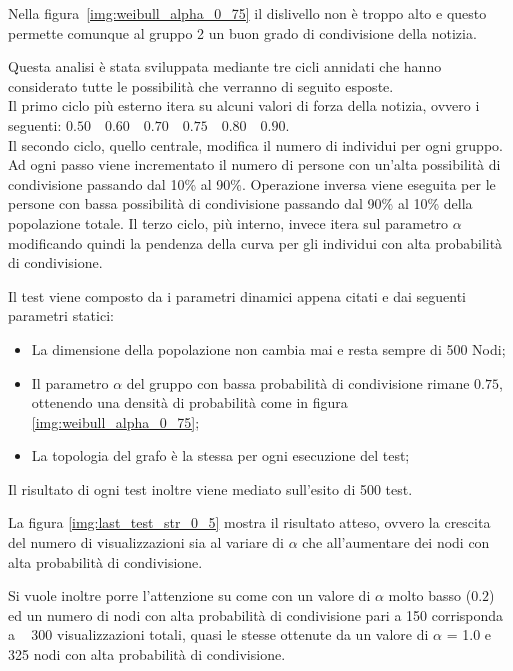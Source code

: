 Nella figura~\ref{img:weibull_alpha_0_75} il dislivello non è troppo alto e questo permette 
comunque al gruppo 2 un buon grado di condivisione della notizia.

Questa analisi è stata sviluppata mediante tre cicli annidati che hanno considerato tutte le 
possibilità che verranno di seguito esposte.\\
Il primo ciclo più esterno itera su alcuni valori di forza della notizia, 
ovvero i seguenti: $0.50 \quad 0.60 \quad 0.70 \quad 0.75 \quad 0.80 \quad 0.90$.\\
Il secondo ciclo, quello centrale, modifica il numero di individui per ogni gruppo. 
Ad ogni passo viene incrementato il numero di persone con un'alta possibilità di condivisione 
passando dal 10\% al 90\%. Operazione inversa viene eseguita per le persone con bassa possibilità di 
condivisione passando dal 90\% al 10\% della popolazione totale.
Il terzo ciclo, più interno, invece itera sul parametro $\alpha$ modificando quindi la pendenza della 
curva per gli individui con alta probabilità di condivisione.

Il test viene composto da i parametri dinamici appena citati e dai seguenti parametri statici:
\begin{itemize}
\item La dimensione della popolazione non cambia mai e resta sempre di 500 Nodi;
\item Il parametro $\alpha$ del gruppo con bassa probabilità di condivisione rimane $0.75$, 
ottenendo una densità di probabilità come in figura \ref{img:weibull_alpha_0_75};
\item La topologia del grafo è la stessa per ogni esecuzione del test;
\end{itemize}

Il risultato di ogni test inoltre viene mediato sull'esito di 500 test.




La figura \ref{img:last_test_str_0_5} mostra il risultato atteso, 
ovvero la crescita del numero di visualizzazioni sia al variare di $\alpha$ che all'aumentare 
dei nodi con alta probabilità di condivisione.

Si vuole inoltre porre l'attenzione su come con un valore di $\alpha$ 
molto basso ($0.2$) ed un numero di nodi con alta probabilità di condivisione pari a 150 corrisponda 
a ~ 300 visualizzazioni totali, quasi le stesse ottenute da un valore di $\alpha$ = 1.0 e 325 nodi con 
alta probabilità di condivisione.




